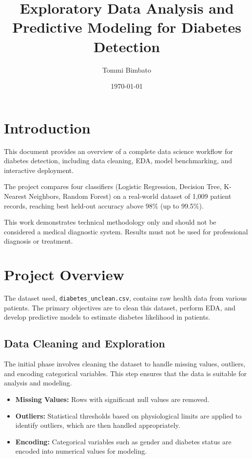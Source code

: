 \documentclass[12pt]{article}
\begin{document}
\title{Exploratory Data Analysis and Predictive Modeling for Diabetes Detection}
\author{Tommi Bimbato}
\date{\today}

\maketitle






\section{Introduction}

This document provides an overview of a complete data science workflow for diabetes detection, including data cleaning, EDA, model benchmarking, and interactive deployment.

The project compares four classifiers (Logistic Regression, Decision Tree, K-Nearest Neighbors, Random Forest) on a real-world dataset of 1,009 patient records, reaching best held-out accuracy above 98\% (up to 99.5\%).


This work demonstrates technical methodology only and should not be considered a medical diagnostic system. Results must not be used for professional diagnosis or treatment.



\section{Project Overview}

The dataset used, \texttt{diabetes\_unclean.csv}, contains raw health data from various patients. The primary objectives are to clean this dataset, perform EDA, and develop predictive models to estimate diabetes likelihood in patients.

\subsection{Data Cleaning and Exploration}

The initial phase involves cleaning the dataset to handle missing values, outliers, and encoding categorical variables. This step ensures that the data is suitable for analysis and modeling.

\begin{itemize}
    \item \textbf{Missing Values:} Rows with significant null values are removed.
    \item \textbf{Outliers:} Statistical thresholds based on physiological limits are applied to identify outliers, which are then handled appropriately.
    \item \textbf{Encoding:} Categorical variables such as gender and diabetes status are encoded into numerical values for modeling.
\end{itemize}
\end{document}
